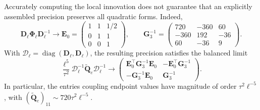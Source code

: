 \documentclass[11pt,a4paper]{article}
\theoremstyle{plain}
\theoremstyle{definition}
\begin{document}
Accurately computing the local innovation does not guarantee that an
explicitly assembled precision preserves all quadratic forms. Indeed,
\begin{equation}
\mathbf D_\ell\boldsymbol\Phi_\ell\mathbf D_\ell^{-1}
\longrightarrow
\mathbf E_0=
\begin{pmatrix}1&1&1/2\\0&1&1\\0&0&1\end{pmatrix},
\qquad
\mathbf G_3^{-1}=
\begin{pmatrix}720&-360&60\\-360&192&-36\\60&-36&9\end{pmatrix}.
\end{equation}
With $\mathcal D_\ell=\operatorname{diag}(\mathbf D_\ell,\mathbf D_\ell)$,
the resulting precision satisfies the balanced limit
\begin{equation}
\frac{\ell^5}{\tau^2}\mathcal D_\ell^{-1}
 \widetilde{\mathbf Q}_e\mathcal D_\ell^{-1}
\longrightarrow
\begin{pmatrix}
\mathbf E_0^\top\mathbf G_3^{-1}\mathbf E_0&-\mathbf E_0^\top\mathbf G_3^{-1}\\
-\mathbf G_3^{-1}\mathbf E_0&\mathbf G_3^{-1}
\end{pmatrix}.
\label{eq:short_edge_precision_limit}
\end{equation}
In particular, the entries coupling endpoint values have magnitude of
order $\tau^2\ell^{-5}$, with
$(\widetilde{\mathbf Q}_e)_{11}\sim720\tau^2\ell^{-5}$.
\end{document}
